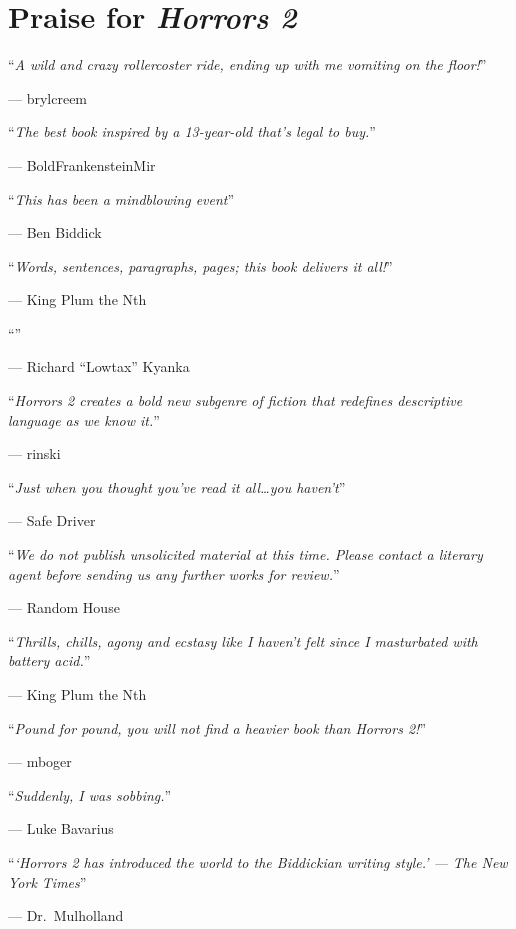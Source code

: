 \chapter*{Praise for \em{Horrors 2}}

\raggedleft
\newcommand{\praise}[2]{
  \noindent``{\em #1}''\par\nopagebreak--- #2\\
  \bigskip
}

\praise{A wild and crazy rollercoster ride, ending up with me vomiting
  on the floor!}{brylcreem}

\praise{The best book inspired by a 13-year-old that's legal to
  buy.}{BoldFrankensteinMir}

\praise{This has been a mindblowing event}{Ben Biddick}

\praise{Words, sentences, paragraphs, pages; this book delivers it
  all!}{King Plum the Nth}

\praise{}{Richard ``Lowtax'' Kyanka}

\praise{{\em Horrors 2} creates a bold new subgenre of fiction that
  redefines descriptive language as we know it.}{rinski}

\praise{Just when you thought you've read it all\ldots you haven't}{Safe
  Driver}

\praise{We do not publish unsolicited material at this time. Please
  contact a literary agent before sending us any further works for
  review.}{Random House}

\praise{Thrills, chills, agony and ecstasy like I haven't felt since I
  masturbated with battery acid.}{King Plum the Nth}

\praise{Pound for pound, you will not find a heavier book than Horrors
  2!}{mboger}

\praise{Suddenly, I was sobbing.}{Luke Bavarius}

\praise{`{\em Horrors 2} has introduced the world to the Biddickian writing
  style.' --- The New York Times}{Dr.\ Mulholland}

\justify
